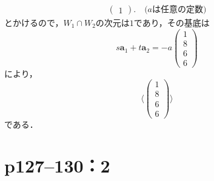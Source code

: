 \documentclass[a4paper,10pt,fleqn]{ltjsarticle}
\begin{document}
\begin{tleftbar}
\begin{align*}
\begin{pmatrix}
            1
        \end{pmatrix}
        . \quad \text{($a$は任意の定数)}
    \end{align*}
    とかけるので，$W_1 \cap W_2$の次元は$1$であり，その基底は
    \[
        s \bm{a}_1+ t \bm{a}_2 =-a \begin{pmatrix} 1 \\ 8 \\ 6 \\ 6 \end{pmatrix}
    \]
    により，
    \[
        \langle
        \begin{pmatrix}
            1 \\
            8 \\
            6 \\
            6
        \end{pmatrix}
        \rangle
    \]
    である．
\end{tleftbar}
\newpage


\section*{p127--130：2}
\end{document}
